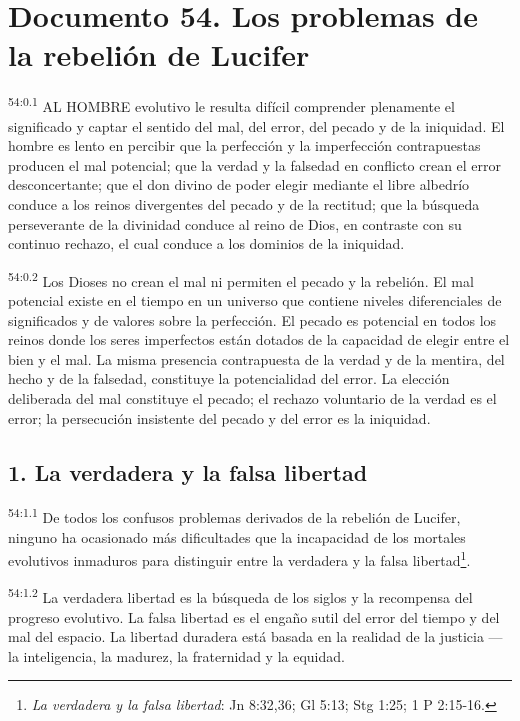 \chapter{Documento 54. Los problemas de la rebelión de Lucifer}
\par
\textsuperscript{54:0.1} AL HOMBRE evolutivo le resulta difícil comprender plenamente el significado y captar el sentido del mal, del error, del pecado y de la iniquidad. El hombre es lento en percibir que la perfección y la imperfección contrapuestas producen el mal potencial; que la verdad y la falsedad en conflicto crean el error desconcertante; que el don divino de poder elegir mediante el libre albedrío conduce a los reinos divergentes del pecado y de la rectitud; que la búsqueda perseverante de la divinidad conduce al reino de Dios, en contraste con su continuo rechazo, el cual conduce a los dominios de la iniquidad.

\par
\textsuperscript{54:0.2} Los Dioses no crean el mal ni permiten el pecado y la rebelión. El mal potencial existe en el tiempo en un universo que contiene niveles diferenciales de significados y de valores sobre la perfección. El pecado es potencial en todos los reinos donde los seres imperfectos están dotados de la capacidad de elegir entre el bien y el mal. La misma presencia contrapuesta de la verdad y de la mentira, del hecho y de la falsedad, constituye la potencialidad del error. La elección deliberada del mal constituye el pecado; el rechazo voluntario de la verdad es el error; la persecución insistente del pecado y del error es la iniquidad.

\section*{1. La verdadera y la falsa libertad}
\par
\textsuperscript{54:1.1} De todos los confusos problemas derivados de la rebelión de Lucifer, ninguno ha ocasionado más dificultades que la incapacidad de los mortales evolutivos inmaduros para distinguir entre la verdadera y la falsa libertad\footnote{\textit{La verdadera y la falsa libertad}: Jn 8:32,36; Gl 5:13; Stg 1:25; 1 P 2:15-16.}.

\par
\textsuperscript{54:1.2} La verdadera libertad es la búsqueda de los siglos y la recompensa del progreso evolutivo. La falsa libertad es el engaño sutil del error del tiempo y del mal del espacio. La libertad duradera está basada en la realidad de la justicia ---la inteligencia, la madurez, la fraternidad y la equidad.

